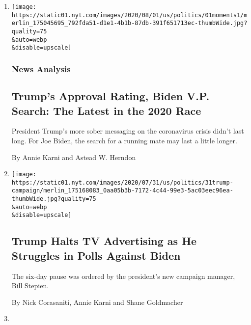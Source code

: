 \begin{enumerate}
\def\labelenumi{\arabic{enumi}.}
\item
  \href{/2020/08/01/us/politics/trump-biden-polls-vp.html}{}

  \texttt{[image: https://static01.nyt.com/images/2020/08/01/us/politics/01moments1/merlin\_175045695\_792fda51-d1e1-4b1b-87db-391f651713ec-thumbWide.jpg?quality=75\\\&auto=webp\\\&disable=upscale]}

  \hypertarget{news-analysis}{%
  \subsubsection{News Analysis}\label{news-analysis}}

  \hypertarget{trumps-approval-rating-biden-vp-search-the-latest-in-the-2020-race}{%
  \subsection{Trump's Approval Rating, Biden V.P. Search: The Latest in
  the 2020
  Race}\label{trumps-approval-rating-biden-vp-search-the-latest-in-the-2020-race}}

  President Trump's more sober messaging on the coronavirus crisis
  didn't last long. For Joe Biden, the search for a running mate may
  last a little longer.

  By Annie Karni and Astead W. Herndon
\item
  \href{/2020/07/31/us/politics/trump-campaign-tv-advertising.html}{}

  \texttt{[image: https://static01.nyt.com/images/2020/07/31/us/politics/31trump-campaign/merlin\_175168083\_0aa05b3b-7172-4c44-99e3-5ac03eec96ea-thumbWide.jpg?quality=75\\\&auto=webp\\\&disable=upscale]}

  \hypertarget{trump-halts-tv-advertising-as-he-struggles-in-polls-against-biden}{%
  \subsection{Trump Halts TV Advertising as He Struggles in Polls
  Against
  Biden}\label{trump-halts-tv-advertising-as-he-struggles-in-polls-against-biden}}

  The six-day pause was ordered by the president's new campaign manager,
  Bill Stepien.

  By Nick Corasaniti, Annie Karni and Shane Goldmacher
\item
  \href{/es/2020/07/31/espanol/estados-unidos/fred-trump-donald-trump.html}{}


\end{enumerate}
